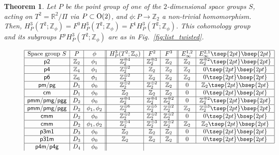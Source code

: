 \documentclass[pdftex]{sigma}
\newtheorem{thm}{Theorem}[section]
\theoremstyle{definition}
\newcommand{\R}{\mathbb{R}}
\newcommand{\Z}{\mathbb{Z}}
\begin{document}
\begin{thm} \label{thm:main_twisted}
Let $P$ be the point group of one of the $2$-dimensional space groups $S$, acting on $T^2 = \R^2/\Pi$ via $P \subset {\rm O}(2)$, and $\phi\colon P \to \Z_2$ a non-trivial homomorphism. Then, $H^3_{P}(T^2; \Z_\phi) = F^0H^3_P(T^2; \Z_\phi) = F^1H^3_P(T^2; \Z_\phi)$. This cohomology group and its subgroups $F^pH^3_P(T^2; \Z_\phi)$ are as in Fig.~{\rm \ref{fig:list_twisted}}.
\begin{figure}[htpb]
$$
\begin{array}{|c|c|c||c|c|c||c|c|}
\hline
\mbox{Space group $S$} & P & \phi &
H^3_P(T^2; \Z_\phi) & F^2 & F^3 &
E^{1,2}_\infty & E^{2,1}_\infty \tsep{2pt}\bsep{2pt}\\
\hline
\mbox{\textsf{p2}} & \Z_2 & \phi_1 &
\Z_2^{\oplus 4} & \Z_2^{\oplus 3} & \Z_2 &
\Z_2 & \Z_2^{\oplus 2} \tsep{2pt}\bsep{2pt}\\
\hline
\mbox{\textsf{p4}} & \Z_4 & \phi_1 &
\Z_2^{\oplus 2} & \Z_2 & \Z_2 &
\Z_2 & 0 \tsep{2pt}\bsep{2pt}\\
\hline
\mbox{\textsf{p6}} & \Z_6 & \phi_1 &
\Z_2^{\oplus 2} & \Z_2 & \Z_2 &
\Z_2 & 0 \tsep{2pt}\bsep{2pt}\\
\hline
\mbox{\textsf{pm}/\textsf{pg}} & D_1 & \phi_0 &
\Z_2^{\oplus 2} & \Z_2^{\oplus 2}& \Z_2 &
0 & \Z_2 \tsep{2pt}\bsep{2pt}\\
\hline
\mbox{\textsf{cm}} & D_1 & \phi_0 &
\Z_2 & \Z_2 & \Z_2 &
0 & 0 \tsep{2pt}\bsep{2pt}\\
\hline
\mbox{\textsf{pmm}/\textsf{pmg}/\textsf{pgg}} & D_2 & \phi_0 &
\Z_2^{\oplus 4} & \Z_2^{\oplus 4} & \Z_2^{\oplus 2} &
0 & \Z_2^{\oplus 2} \tsep{2pt}\bsep{2pt}\\
\hline
\mbox{\textsf{pmm}/\textsf{pmg}/\textsf{pgg}} & D_2 & \phi_1, \phi_2 &
\Z_2^{\oplus 6} & \Z_2^{\oplus 5} & \Z_2^{\oplus 2} &
\Z_2 & \Z_2^{\oplus 3} \tsep{2pt}\bsep{2pt}\\
\hline
\mbox{\textsf{cmm}} & D_2 & \phi_0 &
\Z_2^{\oplus 2} & \Z_2^{\oplus 2} & \Z_2^{\oplus 2} &
0 & 0 \tsep{2pt}\bsep{2pt}\\
\hline
\mbox{\textsf{cmm}} & D_2 & \phi_1, \phi_2 &
\Z_2^{\oplus 4} & \Z_2^{\oplus 3} & \Z_2^{\oplus 2} &
\Z_2 & \Z_2 \tsep{2pt}\bsep{2pt}\\
\hline
\mbox{\textsf{p3m1}} & D_3 & \phi_0 &
\Z_2 & \Z_2 & \Z_2 &
0 & 0 \tsep{2pt}\bsep{2pt}\\
\hline
\mbox{\textsf{p31m}} & D_3 & \phi_0 &
\Z_2 & \Z_2 & \Z_2 &
0 & 0 \tsep{2pt}\bsep{2pt}\\
\hline
\mbox{\textsf{p4m}/\textsf{p4g}} & D_4 & \phi_0 &

\end{array}$$
\end{figure}
\end{thm}
\end{document}
